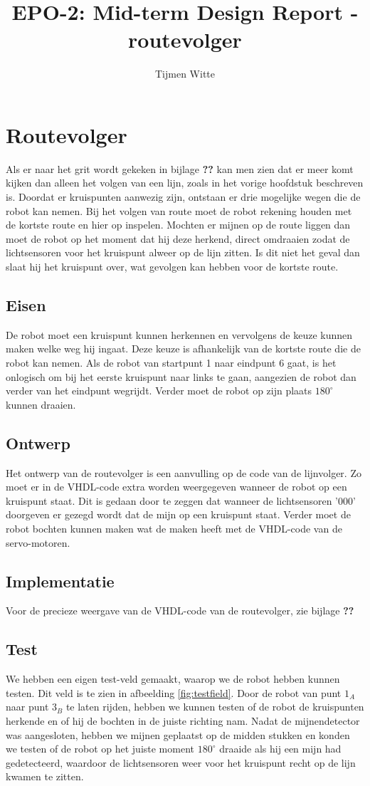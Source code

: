 \documentclass{report}
\title{EPO-2: Mid-term Design Report - routevolger}
\author{Tijmen Witte}
\begin{document}
\chapter{Routevolger}
\label{ch:probleem}

Als er naar het grit wordt gekeken in bijlage \textbf{??} kan men zien dat er meer komt kijken dan alleen het volgen van een lijn, zoals in het vorige hoofdstuk beschreven is. Doordat er kruispunten aanwezig zijn, ontstaan er drie mogelijke wegen die de robot kan nemen. Bij het volgen van route moet de robot rekening houden met de kortste route en hier op inspelen. Mochten er mijnen op de route liggen dan moet de robot op het moment dat hij deze herkend, direct omdraaien zodat de lichtsensoren voor het kruispunt alweer op de lijn zitten. Is dit niet het geval dan slaat hij het kruispunt over, wat gevolgen kan hebben voor de kortste route.   

\section{Eisen}
De robot moet een kruispunt kunnen herkennen en vervolgens de keuze kunnen maken welke weg hij ingaat. Deze keuze is afhankelijk van de kortste route die de robot kan nemen. Als de robot van startpunt 1 naar eindpunt 6 gaat, is het onlogisch om bij het eerste kruispunt naar links te gaan, aangezien de robot dan verder van het eindpunt wegrijdt. Verder moet de robot op zijn plaats $180^\circ$ kunnen draaien.

\section{Ontwerp}
Het ontwerp van de routevolger is een aanvulling op de code van de lijnvolger. Zo moet er in de VHDL-code extra worden weergegeven wanneer de robot op een kruispunt staat. Dit is gedaan door te zeggen dat wanneer de lichtsensoren '000' doorgeven er gezegd wordt dat de mijn op een kruispunt staat. Verder moet de robot bochten kunnen maken wat de maken heeft met de VHDL-code van de servo-motoren.

\section{Implementatie}
Voor de precieze weergave van de VHDL-code van de routevolger, zie bijlage\textbf{ ??}

\section{Test}
We hebben een eigen test-veld gemaakt, waarop we de robot hebben kunnen testen. Dit veld is te zien in afbeelding \ref{fig:testfield}. Door de robot van punt $1_A$ naar punt $3_B$ te laten rijden, hebben we kunnen testen of de robot de kruispunten herkende en of hij de bochten in de juiste richting nam. Nadat de mijnendetector was aangesloten, hebben we mijnen geplaatst op de midden stukken en konden we testen of de robot op het juiste moment $180^\circ$ draaide als hij een mijn had gedetecteerd, waardoor de lichtsensoren weer voor het kruispunt  recht op de lijn kwamen te zitten.
\end{document}
